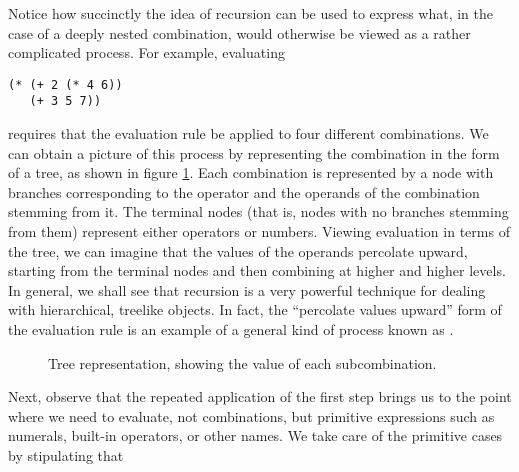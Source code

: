 Notice how succinctly the idea of recursion can be used to express
what, in the case of a deeply nested combination, would otherwise be
viewed as a rather complicated process.  For example, evaluating

\begin{verbatim}
(* (+ 2 (* 4 6))
   (+ 3 5 7))
\end{verbatim}

\noindent requires that the evaluation rule be applied to four
different combinations.  We can obtain a picture of this process by
representing the combination in the form of a tree, as shown in figure
\ref{fig:1.1}.  Each combination is represented by a node with
branches corresponding to the operator and the operands of the
combination stemming from it.  The terminal nodes (that is, nodes with
no branches stemming from them) represent either operators or numbers.
Viewing evaluation in terms of the tree, we can imagine that the
values of the operands percolate upward, starting from the terminal
nodes and then combining at higher and higher levels.  In general, we
shall see that recursion is a very powerful technique for dealing with
hierarchical, treelike objects.  In fact, the ``percolate values
upward'' form of the evaluation rule is an example of a general kind
of process known as .

\begin{figure}
\caption{Tree representation, showing the value of each subcombination.}
\label{fig:1.1} %
\end{figure}

Next, observe that the repeated application of the first step brings
us to the point where we need to evaluate, not combinations, but
primitive expressions such as numerals, built-in operators, or other
names.  We take care of the primitive cases by stipulating that

